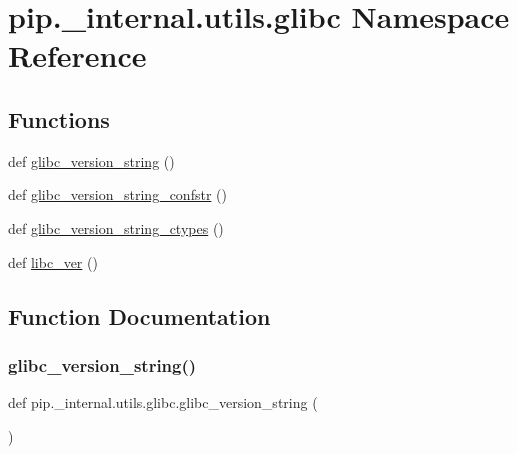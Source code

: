 \hypertarget{namespacepip_1_1__internal_1_1utils_1_1glibc}{}\section{pip.\+\_\+internal.\+utils.\+glibc Namespace Reference}
\label{namespacepip_1_1__internal_1_1utils_1_1glibc}
\subsection*{Functions}
\begin{DoxyCompactItemize}
\item 
def \hyperlink{namespacepip_1_1__internal_1_1utils_1_1glibc_a8f1d27a82a054b39a13249eb48d2c9e9}{glibc\+\_\+version\+\_\+string} ()
\item 
def \hyperlink{namespacepip_1_1__internal_1_1utils_1_1glibc_a3fb841b8bc926a138c236e0de6c4e317}{glibc\+\_\+version\+\_\+string\+\_\+confstr} ()
\item 
def \hyperlink{namespacepip_1_1__internal_1_1utils_1_1glibc_a782095241f5e1b12ffdb9ab7eeb4df79}{glibc\+\_\+version\+\_\+string\+\_\+ctypes} ()
\item 
def \hyperlink{namespacepip_1_1__internal_1_1utils_1_1glibc_af96ed00790040f5e5c73f4ec1925437d}{libc\+\_\+ver} ()
\end{DoxyCompactItemize}


\subsection{Function Documentation}
\mbox{\label{namespacepip_1_1__internal_1_1utils_1_1glibc_a8f1d27a82a054b39a13249eb48d2c9e9}} 
\subsubsection{\texorpdfstring{glibc\+\_\+version\+\_\+string()}{glibc\_version\_string()}}
{\footnotesize\ttfamily def pip.\+\_\+internal.\+utils.\+glibc.\+glibc\+\_\+version\+\_\+string (\begin{DoxyParamCaption}{ }\end{DoxyParamCaption})}

